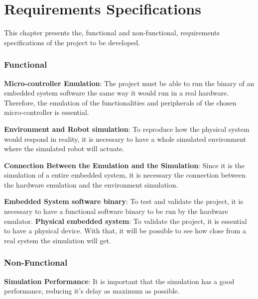 \documentclass[../monografia.tex]{subfiles}
\begin{document}
\chapter{Requirements Specifications}
\label{chapter: Requirements Specifications}

This chapter presents the, functional and non-functional, requirements specifications of the project to be developed. 
\subsection{Functional}
\textbf{Micro-controller Emulation}: The project must be able to run the binary of an embedded system software the same way it would run in a real hardware. Therefore, the emulation of the functionalities and peripherals of the chosen micro-controller is essential.

\textbf{Environment and Robot simulation}: To reproduce how the physical system would respond in reality, it is necessary to have a whole simulated environment where the simulated robot will actuate.

\textbf{Connection Between the Emulation and the Simulation}: Since it is the simulation of a entire embedded system, it is necessary the connection between the hardware emulation and the environment simulation.

\textbf{Embedded System software binary}: To test and validate the project, it is necessary to have a functional software binary to be run by the hardware emulator.
\textbf{Physical embedded system}: To validate the project, it is essential to have a physical device. With that, it will be possible to see how close from a real system the simulation will get.

\subsection{Non-Functional}
\textbf{Simulation Performance}: It is important that the simulation has a good performance, reducing it's delay as maximum as possible.
\end{document}
